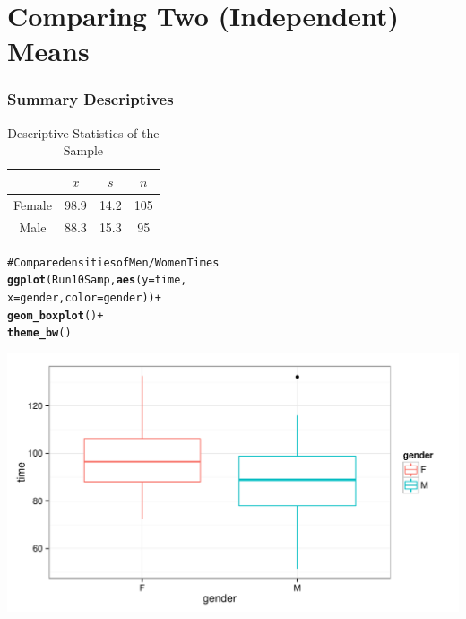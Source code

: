 \documentclass{beamer}\usepackage{graphicx, color}
\makeatletter
\def\maxwidth{ %
  \ifdim\Gin@nat@width>\linewidth
    \linewidth
  \else
    \Gin@nat@width
  \fi
}
\newcommand{\hlfunctioncall}[1]{\textcolor[rgb]{0.501960784313725,0,0.329411764705882}{\textbf{#1}}}%
\newcommand{\hlcomment}[1]{\textcolor[rgb]{0.180392156862745,0.6,0.341176470588235}{#1}}%
\newenvironment{kframe}{%
 \def\at@end@of@kframe{}%
 \ifinner\ifhmode%
  \def\at@end@of@kframe{\end{minipage}}%
  \begin{minipage}{\columnwidth}%
 \fi\fi%
 \def\FrameCommand##1{\hskip\@totalleftmargin \hskip-\fboxsep
 \colorbox{shadecolor}{##1}\hskip-\fboxsep
     \hskip-\linewidth \hskip-\@totalleftmargin \hskip\columnwidth}%
 \MakeFramed {\advance\hsize-\width
   \@totalleftmargin\z@ \linewidth\hsize
   \@setminipage}}%
 {\par\unskip\endMakeFramed%
 \at@end@of@kframe}
\newenvironment{knitrout}{}{} %
\makeatother
\begin{document}
\section{Comparing Two (Independent) Means}


\begin{frame}[fragile]
  \frametitle{Summary Descriptives}


  
  \begin{table}
  \caption{Descriptive Statistics of the Sample}
  \begin{tabular}{c | c c c}
  & $\bar{x}$ & $s$ & $n$ \\
  \hline\hline
  Female & 98.9 & 14.2 & 105 \\
  Male & 88.3 & 15.3 & 95 \\
  \hline
  
  \end{tabular}
  \end{table}
\end{frame}

\begin{frame}
\begin{knitrout}
\color{fgcolor}\begin{kframe}
\begin{alltt}
\hlcomment{# Compare densities of Men/Women Times}
\hlfunctioncall{ggplot}(Run10Samp, \hlfunctioncall{aes}(y = time, 
                      x = gender, color = gender)) +
        \hlfunctioncall{geom_boxplot}() +
        \hlfunctioncall{theme_bw}()
\end{alltt}
\end{kframe}

{\centering \includegraphics[width=\maxwidth]{figure/GenderDist} 

}


\end{knitrout}

\end{frame}
\end{document}

